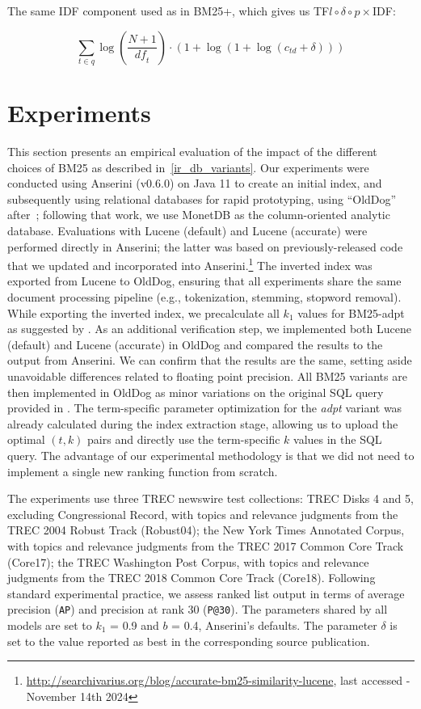 The same IDF component used as in BM25+, which gives us TF$l\circ\delta\circ p\times$IDF: 

\begin{equation}
	\label{tf-ldp-idf}
	\sum_{t\in q}\log\left(\frac{N+1}{\mathit{df}_t}\right)\cdot\left(1+\log\left(1+\log\left(c_{\mathit{td}}+\delta\right)\right)\right)
\end{equation}

\section{Experiments}
This section presents an empirical evaluation of the impact of the different choices of BM25 as described in~\cref{ir_db_variants}.
Our experiments were conducted using Anserini (v0.6.0) on Java 11 to create an initial index, and subsequently using relational databases for rapid prototyping, using ``OldDog''~\citep{olddog-docker} after~\citet{OldDog}; following that work, we use MonetDB as the column-oriented analytic database. Evaluations with Lucene (default) and Lucene (accurate) were performed directly in Anserini; the latter was based on previously-released code that we updated and incorporated into Anserini.\footnote{\url{http://searchivarius.org/blog/accurate-bm25-similarity-lucene}, last accessed - November 14th 2024} The inverted index was exported from Lucene to OldDog, ensuring that all experiments share the same document processing pipeline (e.g., tokenization, stemming, stopword removal). While exporting the inverted index, we precalculate all $k_1$ values for BM25-adpt as suggested by \citet{bm25-adpt}. As an additional verification step, we implemented both Lucene (default) and Lucene (accurate) in OldDog and compared the results to the output from Anserini. We can confirm that the results are the same, setting aside unavoidable differences related to floating point precision. All BM25 variants are then implemented in OldDog as minor variations on the original SQL query provided in \citet{OldDog}. The term-specific parameter optimization for the \emph{adpt} variant was already calculated during the index extraction stage, allowing us to upload the optimal $(t, k)$ pairs and directly use the term-specific $k$ values in the SQL query. The advantage of our experimental methodology is that we did not need to implement a single new ranking function from scratch.

The experiments use three TREC newswire test collections: TREC Disks 4 and 5, excluding Congressional Record, with topics and relevance judgments from the TREC 2004 Robust Track (Robust04); the New York Times Annotated Corpus, with topics and relevance judgments from the TREC 2017 Common Core Track (Core17); the TREC Washington Post Corpus, with topics and relevance judgments from the TREC 2018 Common Core Track (Core18). Following standard experimental practice, we assess ranked list output in terms of average precision (\texttt{AP}) and precision at rank 30 (\texttt{P@30}). The parameters shared by all models are set to $k_1$ = 0.9 and $b$ = 0.4, Anserini’s defaults. The parameter $\delta$ is set to the value reported as best in the corresponding source publication. 

